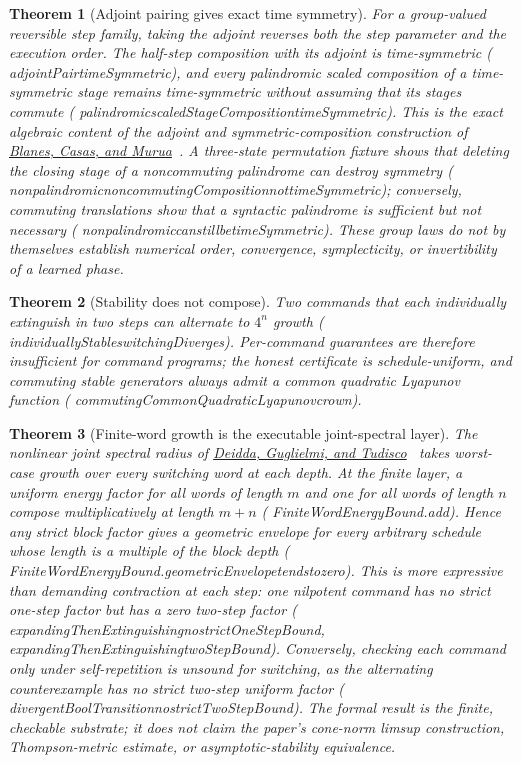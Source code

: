 \documentclass[11pt]{article}
\newtheorem{theorem}{Theorem}[section]
\newcommand{\leanname}[1]{{\scriptsize\ttfamily
  \def\_{\textunderscore\allowbreak}#1}}
\begin{document}
\begin{theorem}[Adjoint pairing gives exact time symmetry]
For a group-valued reversible step family, taking the adjoint reverses both
the step parameter and the execution order.  The half-step composition with
its adjoint is time-symmetric
(\leanname{adjointPair\_timeSymmetric}), and every palindromic scaled
composition of a time-symmetric stage remains time-symmetric without assuming
that its stages commute
(\leanname{palindromic\_scaledStageComposition\_timeSymmetric}).
This is the exact algebraic content of the adjoint and symmetric-composition
construction of
\href{https://arxiv.org/abs/0812.0377}{Blanes, Casas, and
Murua}~\cite{blanes2008}.  A three-state
permutation fixture shows that deleting the closing stage of a noncommuting
palindrome can destroy symmetry
(\leanname{nonpalindromic\_noncommutingComposition\_not\_timeSymmetric});
conversely, commuting translations show that a syntactic palindrome is
sufficient but not necessary
(\leanname{nonpalindromic\_can\_still\_be\_timeSymmetric}).  These group laws
do not by themselves establish numerical order, convergence, symplecticity, or
invertibility of a learned phase.
\end{theorem}

\begin{theorem}[Stability does not compose]
Two commands that each individually extinguish in two steps can alternate to $4^{n}$
growth (\leanname{individuallyStable\_switchingDiverges}). Per-command guarantees are
therefore insufficient for command \emph{programs}; the honest certificate is
schedule-uniform, and commuting stable generators always admit a common quadratic
Lyapunov function (\leanname{commutingCommonQuadraticLyapunov\_crown}).
\end{theorem}

\begin{theorem}[Finite-word growth is the executable joint-spectral layer]
The nonlinear joint spectral radius of
\href{https://arxiv.org/abs/2507.11314}{Deidda, Guglielmi, and
Tudisco}~\cite{deidda2025njsr} takes worst-case growth over every switching
word at each depth.  At the finite layer, a uniform energy factor for all
words of length $m$ and one for all words of length $n$ compose
multiplicatively at length $m+n$
(\leanname{FiniteWordEnergyBound.add}).  Hence any strict block factor gives
a geometric envelope for every arbitrary schedule whose length is a multiple
of the block depth
(\leanname{FiniteWordEnergyBound.geometricEnvelope\_tendsto\_zero}).
This is more expressive than demanding contraction at each step: one
nilpotent command has no strict one-step factor but has a zero two-step factor
(\leanname{expandingThenExtinguishing\_no\_strictOneStepBound},
\leanname{expandingThenExtinguishing\_twoStepBound}).  Conversely, checking
each command only under self-repetition is unsound for switching, as the
alternating counterexample has no strict two-step uniform factor
(\leanname{divergentBoolTransition\_no\_strictTwoStepBound}).
The formal result is the finite, checkable substrate; it does not claim the
paper's cone-norm limsup construction, Thompson-metric estimate, or
asymptotic-stability equivalence.
\end{theorem}
\end{document}

